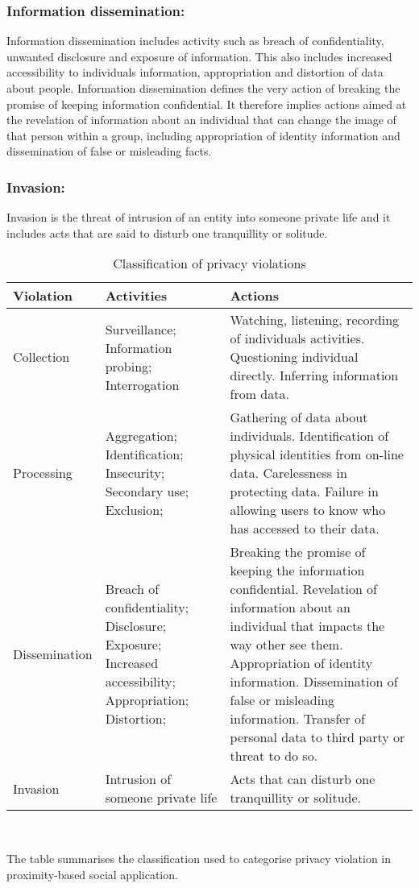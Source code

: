 \subsubsection{Information dissemination:}
Information dissemination includes activity such as breach of confidentiality, unwanted disclosure and exposure of information. This also includes increased accessibility to individuals information, appropriation and distortion of data about people. Information dissemination defines the very action of breaking the promise of keeping information confidential. It therefore implies actions aimed at the revelation of information about an individual that can change the image of that person within a group, including appropriation of identity information and dissemination of false or misleading facts. 
 
\subsubsection{Invasion:}
Invasion is the threat of intrusion of an entity into someone private life and it includes acts that are said to disturb one tranquillity or solitude.

\begin{table*}[ht]
\centering
\caption{Classification of privacy violations}
\def\arraystretch{2.0}
\begin{tabular}{ | p{6em} || p{8em} || p{12em} |}
  \hline
   \textbf{Violation} & \textbf{Activities} & \textbf{Actions} \\
  \hline
  \hline
Collection	
    & Surveillance; Information probing; Interrogation										
    & Watching, listening, recording of individuals activities. Questioning individual directly. Inferring information from data.\\ 
  \hline
Processing 			
    & Aggregation; Identification; Insecurity; Secondary use; Exclusion;						
    & Gathering of data about individuals. Identification of physical identities from on-line data. Carelessness in protecting data.  Failure in allowing users to know who has accessed to their data.	\\
  \hline
Dissemination 			
    & Breach of confidentiality; Disclosure; Exposure; Increased accessibility; Appropriation; Distortion;	& Breaking the promise of keeping the information confidential. Revelation of information about an individual that impacts the way other see them. Appropriation of identity information. Dissemination of false or misleading information. Transfer of personal data to third party or threat to do so. \\
  \hline
Invasion		 		
    & Intrusion of someone private life													
    & Acts that can disturb one tranquillity or solitude. \\
  \hline 
\end{tabular}
\label{tab:violations}
\\[2.5pt]
 \begin{flushleft}
The table summarises the classification used to categorise privacy violation in proximity-based social application.
\end{flushleft}
\end{table*}

